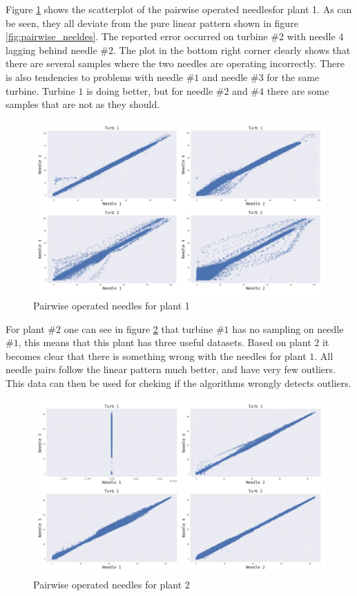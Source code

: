     
    Figure \ref{fig:plant1_needles} shows the scatterplot of the pairwise operated needlesfor plant 1. As can be seen, they all deviate from the pure linear pattern shown in figure \ref{fig:pairwise_neeldes}. The reported error occurred on turbine #$2$ with needle $4$ lagging behind needle #$2$. The plot in the bottom right corner clearly shows that there are several samples where the two needles are operating incorrectly. There is also tendencies to problems with needle #$1$ and needle #$3$ for the same turbine. Turbine $1$ is doing better, but for needle #$2$ and #$4$ there are some samples that are not as they should. 
    
    \begin{figure}
        \centering
        \includegraphics[width=\textwidth]{report/figures/data/plant1_needles.png}
        \caption{Pairwise operated needles for plant 1}
        \label{fig:plant1_needles}
    \end{figure}
    
    For plant #$2$ one can see in figure \ref{fig:plant2_needles} that turbine #$1$ has no sampling on needle #$1$, this means that this plant has three useful datasets. Based on plant 2 it becomes clear that there is something wrong with the needles for plant $1$. All needle pairs follow the linear pattern much better, and have very few outliers. This data can then be used for cheking if the algorithms wrongly detects outliers.
    
    \begin{figure}
        \centering
        \includegraphics[width=\textwidth]{report/figures/data/plant_2_needle_plot.png}
        \caption{Pairwise operated needles for plant 2}
        \label{fig:plant2_needles}
    \end{figure}
    
